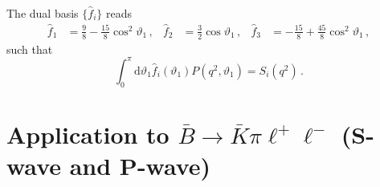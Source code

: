 \documentclass[aps,prd,reprint,nofootinbib,preprintnumbers]{revtex4}
\newcommand{\dd}{\text{d}}
\renewcommand{\theta}{\vartheta}
\begin{document}
The dual basis $\lbrace \hat{f}_i\rbrace$ reads
\begin{equation}
\begin{aligned}
    \hat{f}_1 & = \frac{9}{8} - \frac{15}{8}\cos^2\theta_1\,, &
    \hat{f}_2 & = \frac{3}{2}\cos\theta_1\,, &
    \hat{f}_3 & = -\frac{15}{8} + \frac{45}{8}\cos^2\theta_1\,,
\end{aligned}
\end{equation}
such that 
\begin{equation}
    \int_0^\pi \dd \theta_1\hat{f}_i(\theta_1) P(q^2, \theta_1) = S_i(q^2)\,.
\end{equation}

\section{Application to $\bar{B}\to\bar{K}\pi\ell^+\ell^-$ (S-wave and P-wave)}
\label{app:btokstarll}
\end{document}
